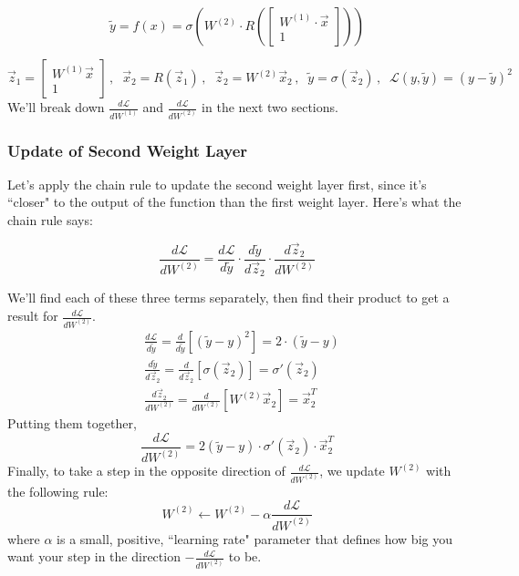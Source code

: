 \documentclass{article}
\begin{document}
\begin{equation*}
\tilde{y} = f(x) = 
\sigma\left(W^{(2)} \cdot R\left(\begin{bmatrix} W^{(1)} \cdot \vec{x} \\ 1\end{bmatrix}\right)\right)
\end{equation*}

\[
\vec{z}_1 = \begin{bmatrix}W^{(1)} \vec{x} \\ 1\end{bmatrix} 
\,,\;\;
\vec{x}_2 = R\left(\vec{z}_1\right)
\,,\;\;
\vec{z}_2 = W^{(2)}\vec{x}_2
\,,\;\;
\tilde{y} = \sigma \left(\vec{z}_2\right)
\,,\;\; \mathcal{L}(y, \tilde{y}) = \left(y - \tilde{y}\right)^{2}
\]
We'll break down $\frac{d\mathcal{L}}{d W^{(1)}}$ and $\frac{d\mathcal{L}}{d W^{(2)}}$ in the next two sections.

\subsubsection{Update of Second Weight Layer}
Let's apply the chain rule to update the second weight layer first, since it's ``closer" to the output of the function than the first weight layer. Here's what the chain rule says:

\[\frac{d\mathcal{L}}{d W^{(2)}} = \frac{d\mathcal{L}}{d \tilde{y}} \cdot \frac{d\tilde{y}}{d\vec{z}_2} \cdot \frac{d\vec{z}_2}{d W^{(2)}}\]

We'll find each of these three terms separately, then find their product to get a result for $\frac{d\mathcal{L}}{d W^{(2)}}$.
\begin{align*}
& \frac{d\mathcal{L}}{d \tilde{y}} = \frac{d}{d \tilde{y}} \left[(\tilde{y} - y)^2\right] = 2 \cdot(\tilde{y} - y) \\
& \frac{d\tilde{y}}{d\vec{z}_2} = \frac{d}{d\vec{z}_2}\left[\sigma(\vec{z}_2)\right] = \sigma'(\vec{z}_2) \\
&\frac{d\vec{z}_2}{d W^{(2)}} = \frac{d}{d W^{(2)}} \left[W^{(2)}\vec{x}_2\right] = \vec{x}_2^{T}
\end{align*}
Putting them together,
\[\frac{d\mathcal{L}}{d W^{(2)}} = 2(\tilde{y} - y) \cdot \sigma'(\vec{z}_2) \cdot \vec{x}_2^{T}\]
Finally, to take a step in the opposite direction of $\frac{d\mathcal{L}}{d W^{(2)}}$, we update $W^{(2)}$ with the following rule:
\[W^{(2)} \xleftarrow{} W^{(2)} - \alpha \frac{d\mathcal{L}}{d W^{(2)}}\]
where $\alpha$ is a small, positive, ``learning rate" parameter that defines how big you want your step in the direction $- \frac{d\mathcal{L}}{d W^{(2)}}$ to be.
\end{document}
